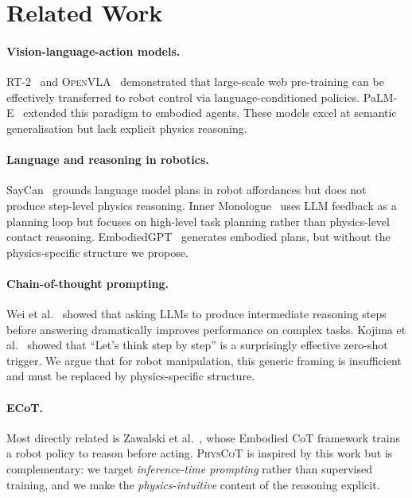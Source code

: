 \documentclass{article}
\newcommand{\physcot}{\textsc{PhysCoT}}
\newcommand{\openvla}{\textsc{OpenVLA}}
\begin{document}
\section{Related Work}
\label{sec:related}

\paragraph{Vision-language-action models.}
RT-2~\citep{brohan2023rt2} and \openvla{}~\citep{kim2024openvla} demonstrated
that large-scale web pre-training can be effectively transferred to robot control
via language-conditioned policies.
PaLM-E~\citep{driess2023palme} extended this paradigm to embodied agents.
These models excel at semantic generalisation but lack explicit physics reasoning.

\paragraph{Language and reasoning in robotics.}
SayCan~\citep{ahn2022saycan} grounds language model plans in robot affordances
but does not produce step-level physics reasoning.
Inner Monologue~\citep{huang2022inner} uses LLM feedback as a planning loop
but focuses on high-level task planning rather than physics-level contact reasoning.
EmbodiedGPT~\citep{mu2023embodiedgpt} generates embodied plans, but without
the physics-specific structure we propose.

\paragraph{Chain-of-thought prompting.}
Wei et al.~\citep{wei2022chain} showed that asking LLMs to produce intermediate
reasoning steps before answering dramatically improves performance on complex tasks.
Kojima et al.~\citep{kojima2022large} showed that ``Let's think step by step''
is a surprisingly effective zero-shot trigger.
We argue that for robot manipulation, this generic framing is insufficient and
must be replaced by physics-specific structure.

\paragraph{ECoT.}
Most directly related is Zawalski et al.~\citep{zawalski2024ecot}, whose
Embodied CoT framework trains a robot policy to reason before acting.
\physcot{} is inspired by this work but is complementary:
we target \emph{inference-time prompting} rather than supervised training,
and we make the \emph{physics-intuitive} content of the reasoning explicit.
\end{document}
